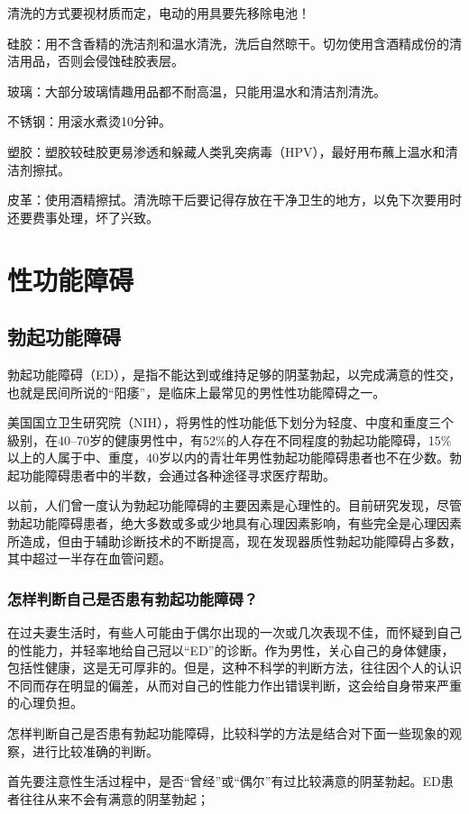 \documentclass[12pt,UTF8]{ctexbook}
\begin{document}
清洗的方式要视材质而定，电动的用具要先移除电池！

硅胶：用不含香精的洗洁剂和温水清洗，洗后自然晾干。切勿使用含酒精成份的清洁用品，否则会侵蚀硅胶表层。

玻璃：大部分玻璃情趣用品都不耐高温，只能用温水和清洁剂清洗。

不锈钢：用滚水煮烫10分钟。

塑胶：塑胶较硅胶更易渗透和躲藏人类乳突病毒（HPV），最好用布蘸上温水和清洁剂擦拭。

皮革：使用酒精擦拭。清洗晾干后要记得存放在干净卫生的地方，以免下次要用时还要费事处理，坏了兴致。

\part{性功能障碍}

\chapter{勃起功能障碍}

勃起功能障碍（ED），是指不能达到或维持足够的阴茎勃起，以完成满意的性交，也就是民间所说的“阳痿”，是临床上最常见的男性性功能障碍之一。

美国国立卫生研究院（NIH），将男性的性功能低下划分为轻度、中度和重度三个級别，在40--70岁的健康男性中，有52\%的人存在不同程度的勃起功能障碍，15\%以上的人属于中、重度，40岁以内的青壮年男性勃起功能障碍患者也不在少数。勃起功能障碍患者中的半数，会通过各种途径寻求医疗帮助。

以前，人们曾一度认为勃起功能障碍的主要因素是心理性的。目前研究发现，尽管勃起功能障碍患者，绝大多数或多或少地具有心理因素影响，有些完全是心理因素所造成，但由于辅助诊断技术的不断提高，现在发现器质性勃起功能障碍占多数，其中超过一半存在血管问题。

\section{怎样判断自己是否患有勃起功能障碍？}

在过夫妻生活时，有些人可能由于偶尔出现的一次或几次表现不佳，而怀疑到自己的性能力，并轻率地给自己冠以“ED”的诊断。作为男性，关心自己的身体健康，包括性健康，这是无可厚非的。但是，这种不科学的判断方法，往往因个人的认识不同而存在明显的偏差，从而对自己的性能力作出错误判断，这会给自身带来严重的心理负担。

怎样判断自己是否患有勃起功能障碍，比较科学的方法是结合对下面一些现象的观察，进行比较准确的判断。

首先要注意性生活过程中，是否“曾经”或“偶尔”有过比较满意的阴茎勃起。ED患者往往从来不会有满意的阴茎勃起；
\end{document}
